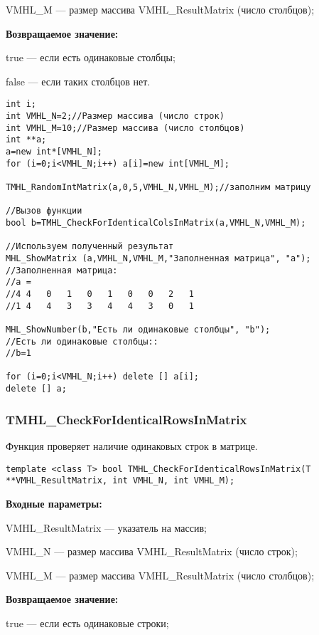 \documentclass[a4paper,12pt]{article}
\begin{document}
VMHL\_M --- размер массива VMHL\_ResultMatrix (число столбцов);

\textbf{Возвращаемое значение:}

 true --- если есть одинаковые столбцы;
 
 false --- если таких столбцов нет.


\begin{lstlisting}[label=code_use_TMHL_CheckForIdenticalColsInMatrix,caption=Пример использования]
int i;
int VMHL_N=2;//Размер массива (число строк)
int VMHL_M=10;//Размер массива (число столбцов)
int **a;
a=new int*[VMHL_N];
for (i=0;i<VMHL_N;i++) a[i]=new int[VMHL_M];

TMHL_RandomIntMatrix(a,0,5,VMHL_N,VMHL_M);//заполним матрицу

//Вызов функции
bool b=TMHL_CheckForIdenticalColsInMatrix(a,VMHL_N,VMHL_M);

//Используем полученный результат
MHL_ShowMatrix (a,VMHL_N,VMHL_M,"Заполненная матрица", "a");
//Заполненная матрица:
//a =
//4	4	0	1	0	1	0	0	2	1
//1	4	4	3	3	4	4	3	0	1

MHL_ShowNumber(b,"Есть ли одинаковые столбцы", "b");
//Есть ли одинаковые столбцы::
//b=1

for (i=0;i<VMHL_N;i++) delete [] a[i];
delete [] a;
\end{lstlisting}

\subsubsection{TMHL\_CheckForIdenticalRowsInMatrix}\label{TMHL_CheckForIdenticalRowsInMatrix}

Функция проверяет наличие одинаковых строк в матрице.


\begin{lstlisting}[label=code_syntax_TMHL_CheckForIdenticalRowsInMatrix,caption=Синтаксис]
template <class T> bool TMHL_CheckForIdenticalRowsInMatrix(T **VMHL_ResultMatrix, int VMHL_N, int VMHL_M);
\end{lstlisting}

\textbf{Входные параметры:}
 
VMHL\_ResultMatrix --- указатель на массив;
 
VMHL\_N --- размер массива VMHL\_ResultMatrix (число строк);
 
VMHL\_M --- размер массива VMHL\_ResultMatrix (число столбцов);

\textbf{Возвращаемое значение:}

 true --- если есть одинаковые строки;
 
\end{document}
